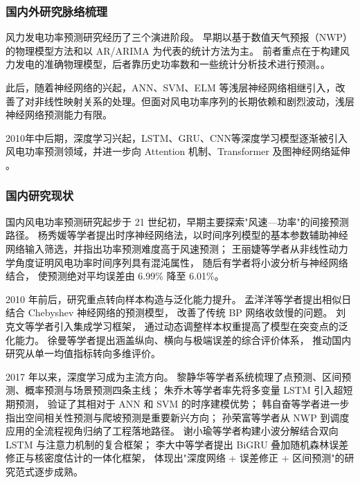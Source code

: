 \subsubsection{国内外研究脉络梳理}
风力发电功率预测研究经历了三个演进阶段。
早期以基于数值天气预报（NWP）的物理模型方法和以 AR/ARIMA 为代表的统计方法为主。
前者重点在于构建风力发电的准确物理模型，后者靠历史功率数和一些统计分析技术进行预测。\cite{liu_deterministic_2019}。

此后，随着神经网络的兴起，ANN、SVM、ELM 等浅层神经网络相继引入，改善了对非线性映射关系的处理。但面对风电功率序列的长期依赖和剧烈波动，浅层神经网络预测能力有限。

2010年中后期，深度学习兴起，LSTM、GRU、CNN等深度学习模型逐渐被引入风电功率预测领域，并进一步向 Attention 机制、Transformer 及图神经网络延伸
\cite{wu_comprehensive_2022, liu_comprehensive_2025, yang_survey_2024}。


\subsubsection{国内研究现状}

国内风电功率预测研究起步于 21 世纪初，早期主要探索"风速—功率"的间接预测路径。
杨秀媛等学者\cite{__2005}提出时序神经网络法，以时间序列模型的基本参数辅助神经网络输入筛选，并指出功率预测难度高于风速预测；
王丽婕等学者\cite{_-_2007}从非线性动力学角度证明风电功率时间序列具有混沌属性，
随后有学者将小波分析与神经网络结合\cite{__2009}，
使预测绝对平均误差由 6.99\% 降至 6.01\%。

2010 年前后，研究重点转向样本构造与泛化能力提升。
孟洋洋等学者\cite{__2010}提出相似日结合 Chebyshev 神经网络的预测模型，
改善了传统 BP 网络收敛慢的问题。
刘克文等学者\cite{__2013}引入集成学习框架，
通过动态调整样本权重提高了模型在突变点的泛化能力。
徐曼等学者\cite{__2011}提出涵盖纵向、横向与极端误差的综合评价体系，
推动国内研究从单一均值指标转向多维评价。

2017 年以来，深度学习成为主流方向。
黎静华等学者\cite{__2017-1}系统梳理了点预测、区间预测、概率预测与场景预测四条主线；
朱乔木等学者\cite{__2017}率先将多变量 LSTM 引入超短期预测，
验证了其相对于 ANN 和 SVM 的时序建模优势；
韩自奋等学者\cite{__2019}进一步指出空间相关性预测与爬坡预测是重要新兴方向；
孙荣富等学者\cite{__2021}从 NWP 到调度应用的全流程视角归纳了工程落地路径。
谢小瑜等学者\cite{_w-bilstm_2021}构建小波分解结合双向 LSTM 与注意力机制的复合框架；
李大中等学者\cite{__2021-1}提出 BiGRU 叠加随机森林误差修正与核密度估计的一体化框架，
体现出"深度网络 + 误差修正 + 区间预测"的研究范式逐步成熟。

